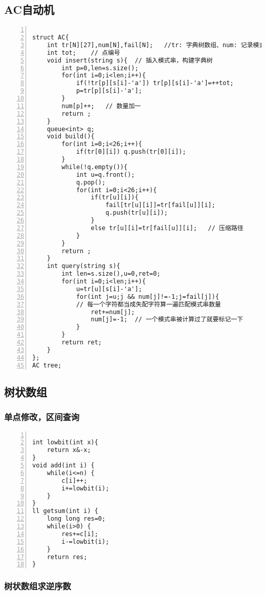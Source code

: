 \subsection{AC自动机}

\begin{lstlisting}[language={[ANSI]C},numbers=left]

struct AC{
	int tr[N][27],num[N],fail[N];	//tr: 字典树数组、num: 记录模式串数量、失配跳转指针
	int tot;	// 点编号
	void insert(string s){	// 插入模式串，构建字典树
		int p=0,len=s.size();
		for(int i=0;i<len;i++){
			if(!tr[p][s[i]-'a']) tr[p][s[i]-'a']=++tot;
			p=tr[p][s[i]-'a'];
		}
		num[p]++;	// 数量加一
		return ;
	}
	queue<int> q;
	void build(){
		for(int i=0;i<26;i++){
			if(tr[0][i]) q.push(tr[0][i]);
		}
		while(!q.empty()){
			int u=q.front();
			q.pop();
			for(int i=0;i<26;i++){
				if(tr[u][i]){
					fail[tr[u][i]]=tr[fail[u]][i];
					q.push(tr[u][i]);
				}
				else tr[u][i]=tr[fail[u]][i];	// 压缩路径
			}
		}
		return ;
	}
	int query(string s){
		int len=s.size(),u=0,ret=0;
		for(int i=0;i<len;i++){
			u=tr[u][s[i]-'a'];
			for(int j=u;j && num[j]!=-1;j=fail[j]){	
			// 每一个字符都当成失配字符算一遍匹配模式串数量
				ret+=num[j];
				num[j]=-1;	// 一个模式串被计算过了就要标记一下
			}
		}
		return ret;
	}
};
AC tree;
\end{lstlisting}

\subsection{树状数组}

\subsubsection{单点修改，区间查询}

\begin{lstlisting}[language={[ANSI]C},numbers=left]

int lowbit(int x){
	return x&-x;
}
void add(int i) {
	while(i<=n) {
		c[i]++;
		i+=lowbit(i);
	}
}
ll getsum(int i) {
	long long res=0;
	while(i>0) {
		res+=c[i];
		i-=lowbit(i);
	}
	return res;
}
\end{lstlisting}

\subsubsection{树状数组求逆序数}

